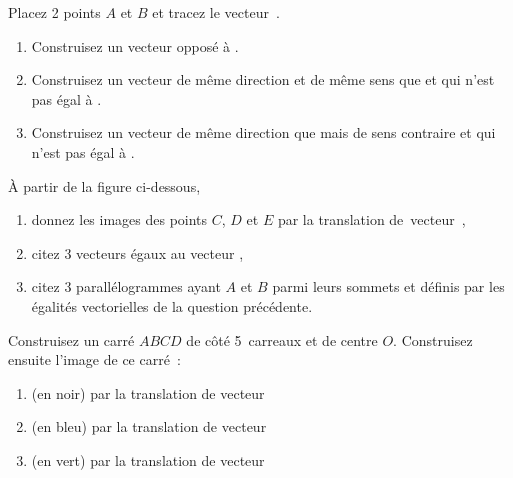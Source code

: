 \documentclass[a4paper,12pt,twocolumn,landscape]{article}
\begin{document}
\begin{minipage}{0.45\textwidth}
\thispagestyle{firststyle}

\exercice Placez 2 points $A$ et $B$ et tracez le vecteur~.
\begin{enumerate}
	\item Construisez un vecteur opposé à .
	\item Construisez un vecteur de même direction et de même sens que  et qui n'est pas égal à .
	\item Construisez un vecteur de même direction que  mais de sens contraire et qui n'est pas égal à .
\end{enumerate}

\exercice À partir de la figure ci-dessous,
\begin{enumerate}
	\item donnez les images des points $C$, $D$ et $E$ par la translation de~vecteur~,
	\item citez 3 vecteurs égaux au vecteur ,
	\item citez 3 parallélogrammes ayant $A$ et $B$ parmi leurs sommets et définis par les égalités vectorielles de la question précédente.
\end{enumerate}
\begin{center}
\end{center}

\exercice Construisez un carré $ABCD$ de côté 5~carreaux et de centre $O$. Construisez ensuite l'image de ce carré~:
\begin{enumerate}
	\item (en noir) par la translation de vecteur 
	\item (en bleu) par la translation de vecteur 
	\item (en vert) par la translation de vecteur 
\end{enumerate}

\vspace*{-5em}

\end{minipage}
\newpage
\end{document}
